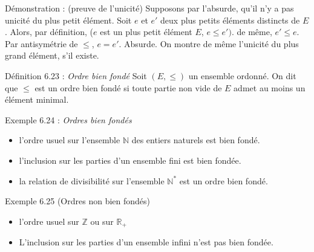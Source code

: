 \documentclass{article}
\begin{document}
\begin{adjustwidth}{-3cm}{-3cm}
Démonstration : (preuve de l'unicité)
Supposons par l'absurde, qu'il n'y a pas unicité du plus petit élément. 
Soit $e$ et $e'$ deux plus petits éléments distincts de $E$. 
Alors, par définition, ($e$ est un plus petit élément $E$, $e \leq e')$. de même, $e' \leq e$. 
Par antisymétrie de $\leq$, $e=e'$. Absurde.
On montre de même l'unicité du plus grand élément, s'il existe.

Définition 6.23 : \textit{Ordre bien fondé}
Soit $(E,\leq)$ un ensemble ordonné.
On dit que $\leq$ est un ordre bien fondé si toute partie non vide de $E$ admet au moins un élément minimal.

Exemple 6.24 : \textit{Ordres bien fondés}
    \begin{itemize}
        \item l'ordre usuel sur l'ensemble $\mathbb{N}$ des entiers naturels est bien fondé.
        \item l'inclusion sur les parties d'un ensemble fini est bien fondée.
        \item la relation de divisibilité sur l'ensemble $\mathbb{N}^*$ est un ordre bien fondé.
    \end{itemize}

    Exemple 6.25 (Ordres non bien fondés)
    \begin{itemize}
        \item l'ordre usuel sur $\mathbb{Z}$ ou sur $\mathbb{R_+}$
        \item L'inclusion sur les parties d'un ensemble infini n'est pas bien fondée.
    \end{itemize}

    


\end{adjustwidth}
\end{document}
